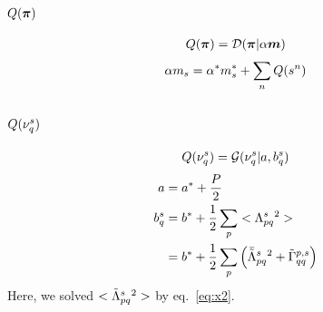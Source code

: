 \documentclass[a4paper]{article}
\begin{document}
\subsection{$Q(\boldsymbol{\pi})$}
\begin{align}
  Q(\boldsymbol{\pi})=\mathcal{D}(\boldsymbol{\pi}|\alpha\boldsymbol{m})
\end{align}
\begin{align}
  \alpha m_s=\alpha^*m^*_s+\sum_n Q(s^n)
\end{align}

\subsection{$Q(\nu^s_q)$}
\begin{align}
 Q(\nu^s_q)=\mathcal{G}(\nu^s_q|a, b_q^s)
\end{align}
\begin{align}
a&=a^*+\frac{P}{2} \\
b_q^s&=b^*+\frac{1}{2}\sum_p<\Lambda^s_{pq}{}^2> \\
&=b^*+\frac{1}{2}\sum_p\left(\bar{\tilde{\Lambda}}^s_{pq}{}^2 + \tilde{\Gamma}^{p,s}_{qq}\right)
\end{align}
Here, we solved $<\tilde{\Lambda}^s_{pq}{}^2>$ by eq.~\ref{eq:x2}.
\end{document}
